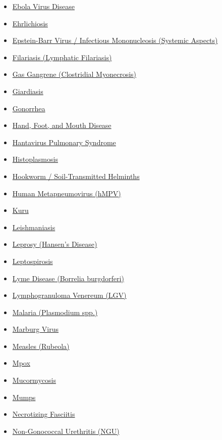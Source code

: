 \begin{itemize}[noitemsep]
  \item \hyperlink{sec:Ebola Virus Disease}{Ebola Virus Disease}
  \item \hyperlink{sec:Ehrlichiosis}{Ehrlichiosis}
  \item \hyperlink{sec:Epstein-Barr Virus Systemic}{Epstein-Barr Virus / Infectious Mononucleosis (Systemic Aspects)}
  \item \hyperlink{sec:Filariasis}{Filariasis (Lymphatic Filariasis)}
  \item \hyperlink{sec:Gas Gangrene}{Gas Gangrene (Clostridial Myonecrosis)}
  \item \hyperlink{sec:Giardiasis}{Giardiasis}
  \item \hyperlink{sec:Gonorrhea}{Gonorrhea}
  \item \hyperlink{sec:Hand, Foot, and Mouth Disease}{Hand, Foot, and Mouth Disease}
  \item \hyperlink{sec:Hantavirus Pulmonary Syndrome}{Hantavirus Pulmonary Syndrome}
  \item \hyperlink{sec:Histoplasmosis}{Histoplasmosis}
  \item \hyperlink{sec:Hookworm Soil-Transmitted Helminths}{Hookworm / Soil-Transmitted Helminths}
  \item \hyperlink{sec:Human Metapneumovirus}{Human Metapneumovirus (hMPV)}
  \item \hyperlink{sec:Kuru}{Kuru}
  \item \hyperlink{sec:Leishmaniasis}{Leishmaniasis}
  \item \hyperlink{sec:Leprosy}{Leprosy (Hansen's Disease)}
  \item \hyperlink{sec:Leptospirosis}{Leptospirosis}
  \item \hyperlink{sec:Lyme Disease}{Lyme Disease (Borrelia burgdorferi)}
  \item \hyperlink{sec:Lymphogranuloma Venereum}{Lymphogranuloma Venereum (LGV)}
  \item \hyperlink{sec:Malaria}{Malaria (Plasmodium spp.)}
  \item \hyperlink{sec:Marburg Virus}{Marburg Virus}
  \item \hyperlink{sec:Measles}{Measles (Rubeola)}
  \item \hyperlink{sec:Mpox}{Mpox}
  \item \hyperlink{sec:Mucormycosis}{Mucormycosis}
  \item \hyperlink{sec:Mumps}{Mumps}
  \item \hyperlink{sec:Necrotizing Fasciitis}{Necrotizing Fasciitis}
  \item \hyperlink{sec:Non-Gonococcal Urethritis}{Non-Gonococcal Urethritis (NGU)}

\end{itemize}
